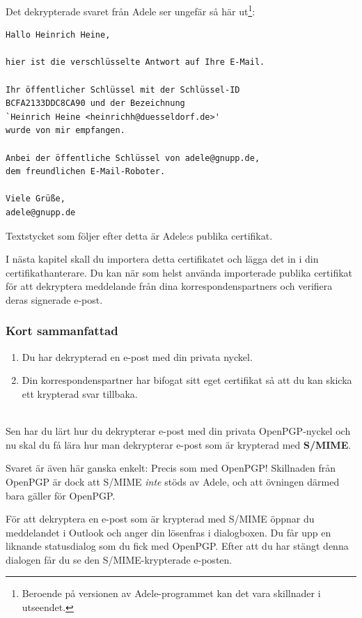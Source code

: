 \documentclass[a4paper,11pt, oneside,openright,titlepage,dvips]{scrbook}
\newcommand\margin[1]{\marginline {\sffamily\scriptsize #1}}
\newcommand{\IncludeImage}[2][]{\texorhtml{%
\texttt{[image: \#2]}%
}{%
\htmlimg{#2.png}%
}}
\newcounter{part}
\newcounter{chapter}
\newcounter{section}[chapter]
\begin{document}
Det dekrypterade svaret från Adele ser ungefär så här ut\footnote{Beroende
  på versionen av Adele-programmet kan det vara
  skillnader i utseendet.}:

\begin{verbatim}
Hallo Heinrich Heine,

hier ist die verschlüsselte Antwort auf Ihre E-Mail.

Ihr öffentlicher Schlüssel mit der Schlüssel-ID
BCFA2133DDC8CA90 und der Bezeichnung
`Heinrich Heine <heinrichh@duesseldorf.de>'
wurde von mir empfangen.

Anbei der öffentliche Schlüssel von adele@gnupp.de,
dem freundlichen E-Mail-Roboter.

Viele Grüße,
adele@gnupp.de
\end{verbatim}

Textstycket som följer efter detta är Adele:s publika certifikat.

I nästa kapitel skall du importera detta certifikatet och lägga det
in i din certifikathanterare. Du kan när som helst använda importerade
publika certifikat för att dekryptera meddelande från dina
korrespondenspartners och verifiera deras signerade e-post.

\clearpage
\subsubsection{Kort sammanfattad}

\begin{enumerate}
\item Du har dekrypterad en e-post med din
  privata nyckel.

\item Din korrespondenspartner har bifogat sitt eget certifikat
    så att du kan skicka ett krypterad svar tillbaka.
\end{enumerate}

\label{encrypt-smime}
~\\Sen
har du lärt hur du dekrypterar e-post med din privata OpenPGP-nyckel
\T\margin{\IncludeImage[width=1.5cm]{smime-icon}}
och nu skal du få lära hur man dekrypterar e-post som är krypterad
med \textbf{S/MIME}.

Svaret är även här ganska enkelt: Precis som med OpenPGP!
Skillnaden från OpenPGP är dock att S/MIME \textit{inte}
stöds av Adele, och att övningen därmed bara gäller för
OpenPGP.

För att dekryptera en e-post som är krypterad med S/MIME öppnar du
meddelandet i Outlook och anger din lösenfras i dialogboxen.
Du får upp en liknande statusdialog som du fick med OpenPGP. Efter att du
har stängt denna dialogen får du se den S/MIME-krypterade e-posten.
\end{document}
